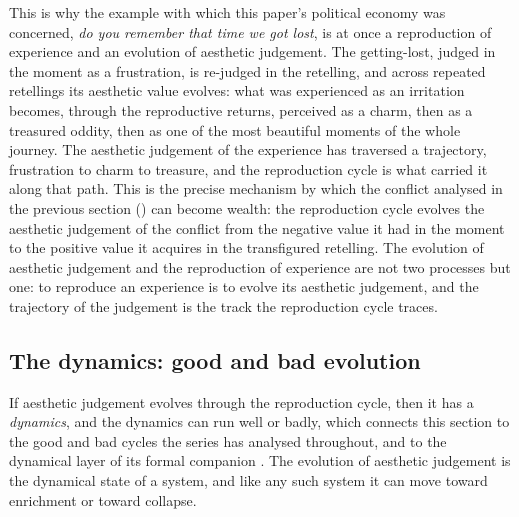 This is why the example with which this paper's political economy was concerned, \emph{do you remember that time we got lost}, is at once a reproduction of experience and an evolution of aesthetic judgement. The getting-lost, judged in the moment as a frustration, is re-judged in the retelling, and across repeated retellings its aesthetic value evolves: what was experienced as an irritation becomes, through the reproductive returns, perceived as a charm, then as a treasured oddity, then as one of the most beautiful moments of the whole journey. The aesthetic judgement of the experience has traversed a trajectory, frustration to charm to treasure, and the reproduction cycle is what carried it along that path. This is the precise mechanism by which the conflict analysed in the previous section () can become wealth: the reproduction cycle evolves the aesthetic judgement of the conflict from the negative value it had in the moment to the positive value it acquires in the transfigured retelling. The evolution of aesthetic judgement and the reproduction of experience are not two processes but one: to reproduce an experience is to evolve its aesthetic judgement, and the trajectory of the judgement is the track the reproduction cycle traces.

\subsection{The dynamics: good and bad evolution}
\label{p21:sub:ev-dynamics}

If aesthetic judgement evolves through the reproduction cycle, then it has a \emph{dynamics}, and the dynamics can run well or badly, which connects this section to the good and bad cycles the series has analysed throughout, and to the dynamical layer of its formal companion \parencite{paperix,wan2026braid}. The evolution of aesthetic judgement is the dynamical state of a system, and like any such system it can move toward enrichment or toward collapse.

